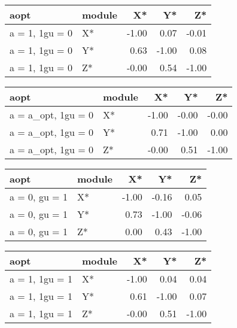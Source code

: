 \documentclass[10pt,a4paper]{article}
\begin{document}
\begin{table}[ht]
\centering
\begin{tabular}{llrrr}
  \hline
aopt & module & X* & Y* & Z* \\ 
  \hline
a = 1, 1gu = 0 & X* & -1.00 & 0.07 & -0.01 \\ 
  a = 1, 1gu = 0 & Y* & 0.63 & -1.00 & 0.08 \\ 
  a = 1, 1gu = 0 & Z* & -0.00 & 0.54 & -1.00 \\ 
   \hline
\end{tabular}
\end{table}


\begin{table}[ht]
\centering
\begin{tabular}{llrrr}
  \hline
aopt & module & X* & Y* & Z* \\ 
  \hline
a = a\_opt, 1gu = 0 & X* & -1.00 & -0.00 & -0.00 \\ 
  a = a\_opt, 1gu = 0 & Y* & 0.71 & -1.00 & 0.00 \\ 
  a = a\_opt, 1gu = 0 & Z* & -0.00 & 0.51 & -1.00 \\ 
   \hline
\end{tabular}
\end{table}


\begin{table}[ht]
\centering
\begin{tabular}{llrrr}
  \hline
aopt & module & X* & Y* & Z* \\ 
  \hline
a = 0, gu = 1 & X* & -1.00 & -0.16 & 0.05 \\ 
  a = 0, gu = 1 & Y* & 0.73 & -1.00 & -0.06 \\ 
  a = 0, gu = 1 & Z* & 0.00 & 0.43 & -1.00 \\ 
   \hline
\end{tabular}
\end{table}


\begin{table}[ht]
\centering
\begin{tabular}{llrrr}
  \hline
aopt & module & X* & Y* & Z* \\ 
  \hline
a = 1, 1gu = 1 & X* & -1.00 & 0.04 & 0.04 \\ 
  a = 1, 1gu = 1 & Y* & 0.61 & -1.00 & 0.07 \\ 
  a = 1, 1gu = 1 & Z* & -0.00 & 0.51 & -1.00 \\ 
   \hline
\end{tabular}
\end{table}
\end{document}
